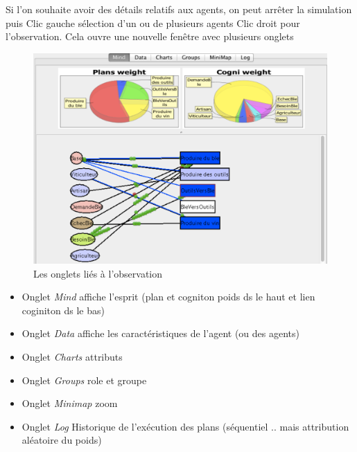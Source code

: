 \documentclass[a4paper,oneside,12 pt]{article}
\begin{document}
Si l'on souhaite avoir des détails relatifs aux agents, on peut arrêter la simulation puis 
Clic gauche sélection d'un ou de plusieurs agents
Clic droit pour l'observation. Cela ouvre une nouvelle fenêtre avec plusieurs onglets
\begin{figure}[hbtp]
\begin{center}
 \includegraphics [scale=0.5] {Observe.pdf}
\end{center}
 \caption{Les onglets liés à l'observation }
\end{figure}
\begin{itemize}
\item Onglet \textit{ Mind}
affiche l'esprit (plan et cogniton poids ds le haut et  lien coginiton ds le bas)
\item Onglet \textit{Data}
affiche les caractéristiques de l'agent (ou des agents)
\item Onglet\textit{ Charts}
attributs
\item Onglet \textit{Groups}
role et groupe
\item Onglet\textit{ Minimap}
zoom 
\item Onglet \textit{Log}
Historique de l'exécution des plans (séquentiel .. mais attribution aléatoire du poids)
\end{itemize}
\end{document}
